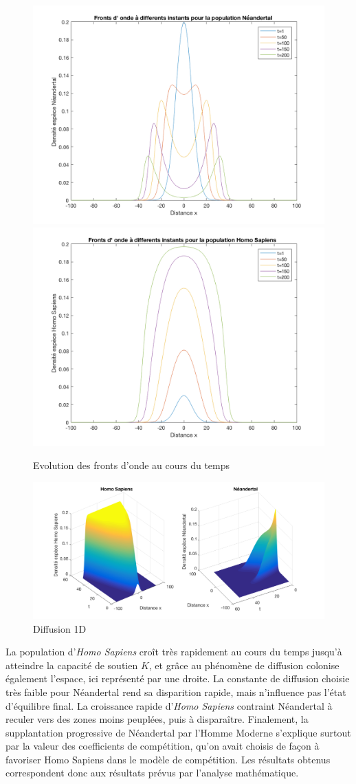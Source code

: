 \documentclass[a4paper,11pt]{article}
\begin{document}
\begin{figure}[H]
\centering
\includegraphics[width=0.45\linewidth]{Comp/neand.png}
\includegraphics[width=0.45\linewidth]{Comp/homo.png}
\caption{Evolution des fronts d'onde au cours du temps}
\end{figure}

\begin{figure}[H]
\centering
\includegraphics[scale=0.3]{Comp/CompDiff2.png}
\caption{Diffusion 1D}
\end{figure}

La population d'\textit{Homo Sapiens} croît très rapidement au cours du temps jusqu'à atteindre la capacité de soutien $K$, et grâce au phénomène de diffusion colonise également l'espace, ici représenté par une droite. La constante de diffusion choisie très faible pour Néandertal rend sa disparition rapide, mais n'influence pas l'état d'équilibre final. La croissance rapide d'\textit{Homo Sapiens} contraint Néandertal à reculer vers des zones moins peuplées, puis à disparaître.
Finalement, la supplantation progressive de Néandertal par l'Homme Moderne s'explique surtout par la valeur des coefficients de compétition, qu'on avait choisis de façon à favoriser Homo Sapiens dans le modèle de compétition. Les résultats obtenus correspondent donc aux résultats prévus par l'analyse mathématique.
\end{document}
